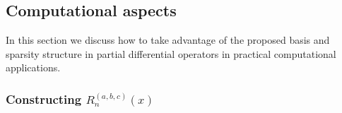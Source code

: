 \documentclass[11pt, oneside]{article}   	%
\newcommand{\genjac}{R}
\begin{document}
\subsection{Computational aspects}\label{Section:Computation}

In this section we discuss how to take advantage of the proposed basis and sparsity structure in partial differential operators in practical computational applications.

\subsubsection{Constructing $\genjac_n^{(a,b,c)}(x)$}

\end{document}

